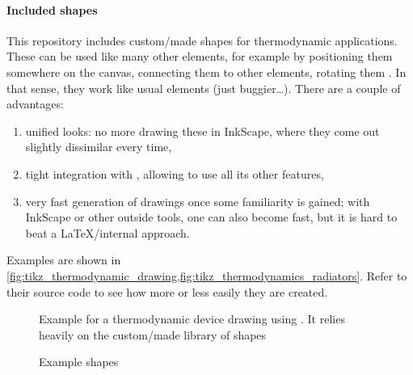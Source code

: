 \paragraph{Included shapes}
This repository includes custom\-/made shapes for thermodynamic applications.
These can be used like many other  elements, for example by
positioning them somewhere on the canvas, connecting them to other elements,
rotating them .
In that sense, they work like usual  elements (just buggier\dots{}).
There are a couple of advantages:
\begin{enumerate}
    \item unified looks: no more drawing these in InkScape, where they come out
          slightly dissimilar every time,
    \item tight integration with , allowing to use all its other
          features,
    \item very fast generation of drawings once some familiarity is gained;
          with InkScape or other outside tools, one can also become fast, but it is
          hard to beat a \LaTeX{}\-/internal approach.
\end{enumerate}
Examples are shown in
\cref{fig:tikz_thermodynamic_drawing,fig:tikz_thermodynamics_radiators}.
Refer to their source code to see how more or less easily they are created.

\begin{figure}[tbp]
\ContinuedFloat*
    \centering
    \caption{%
        Example for a thermodynamic device drawing using .
        It relies heavily on the custom\-/made library of shapes%
    }
    \label{fig:tikz_thermodynamic_drawing}
\end{figure}

\begin{figure}[tbp]

    \centering
    \caption{Example  shapes}
    \label{fig:tikz_thermodynamics_radiators}
\end{figure}

